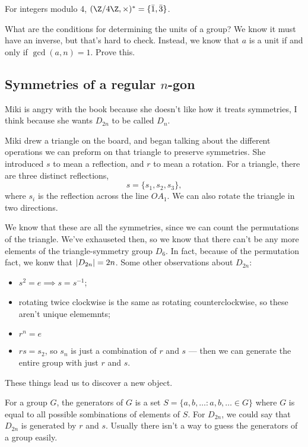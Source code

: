 \begin{example}
For integers modulo 4, $(\Z/4\Z, \times)^* = \{\bar{1}, \bar{3}\}$.
\end{example}

\begin{problem}[On Homework]
What are the conditions for determining the units of a group? We know it must have an inverse, but that's hard to check. Instead, we know that $a$ is a unit if and only if $\gcd(a,n) = 1$. Prove this.
\end{problem}

\subsection{Symmetries of a regular \texorpdfstring{$n$}{n}-gon}
Miki is angry with the book because she doesn't like how it treats symmetries, I think because she wants $D_{2n}$ to be called $D_n$.

Miki drew a triangle on the board, and began talking about the different operations we can preform on that triangle to preserve symmetries. She introduced $s$ to mean a reflection, and $r$ to mean a rotation. For a triangle, there are three distinct reflections,
\[ s = \{s_1, s_2, s_3 \}, \]
where $s_i$ is the reflection across the line $OA_1$. We can also rotate the triangle in two directions.

We know that these are all the symmetries, since we can count the permutations of the triangle. We've exhauseted then, so we know that there can't be any more elements of the triangle-symmetry group $D_6$. In fact, because of the permutation fact, we konw that $\abs{D_{2n}} = 2n$. Some other observations about $D_{2n}$:
\begin{itemize}
\item $s^2 = e \implies s = s^{-1}$;
\item rotating twice clockwise is the same as rotating counterclockwise, so these aren't unique elememnts;
\item $r^n = e$
\item $rs = s_2$, so $s_n$ is just a combination of $r$ and $s$ --- then we can generate the entire group with just $r$ and $s$.
\end{itemize}
These things lead us to discover a new object.

\begin{definition}[Generators]
For a group $G$, the generators of $G$ is a set $ S = \{a,b,\dotsc : a,b,\dotsc \in G\}$ where $G$ is equal to all possible sombinations of elements of $S$. For $D_{2n}$, we could say that $D_{2n}$ is generated by $r$ and $s$.
Usually there isn't a way to guess the generators of a group easily.
\end{definition}


